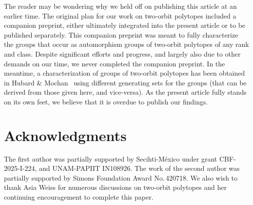 \documentclass[12pt]{article}
\renewcommand{\>}{\rangle}
\theoremstyle{definition}\newtheorem{definition}{Definition}[section]
\begin{document}




The reader may be wondering why we held off on publishing this article at an earlier time. The original plan for our work on two-orbit polytopes included a companion preprint, either ultimately integrated into the present article or to be published separately. This companion preprint was meant to fully characterize the groups that occur as automorphism groups of two-orbit polytopes of any rank and class. Despite significant efforts and progress, and largely also due to other demands on our time, we never completed the companion preprint. 
In the meantime, a characterization of groups of two-orbit polytopes has been obtained in Hubard \& Mochan~\cite{HM2023} using different generating sets for the groups (that can be derived from { those} given here, and vice-versa). 
As the present article fully stands on its own feet, we believe that it is overdue to publish our findings. 

\section*{Acknowledgments}

The first author was partially supported by Secihti-M\'exico under grant CBF-2025-I-224, and UNAM-PAPIIT IN108926. The work of the second author was partially supported by Simons Foundation Award No.\,420718. We also wish to thank Asia Weiss for numerous discussions on two-orbit polytopes and her continuing encouragement to complete this paper.
\end{document}
